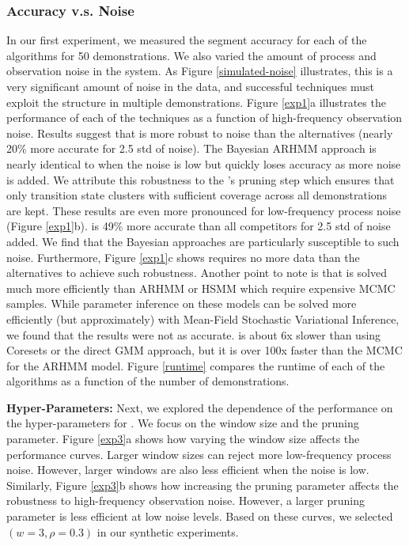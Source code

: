 \subsubsection{Accuracy v.s. Noise}
In our first experiment, we measured the segment accuracy for each of the algorithms for 50 demonstrations.
We also varied the amount of process and observation noise in the system.
As Figure \ref{simulated-noise} illustrates, this is a very significant amount of noise in the data, and successful techniques must exploit the structure in multiple demonstrations.
Figure \ref{exp1}a illustrates the performance of each of the techniques as a function of high-frequency observation noise.
Results suggest that \tsc is more robust to noise than the alternatives (nearly 20\% more accurate for 2.5 std of noise).
The Bayesian ARHMM approach is nearly identical to \tsc when the noise is low but quickly loses accuracy as more noise is added.
We attribute this robustness to the \tsc's pruning step which ensures that only transition state clusters with sufficient coverage across all demonstrations are kept.
These results are even more pronounced for low-frequency process noise (Figure \ref{exp1}b). \tsc is 49\% more accurate than all competitors for 2.5 std of noise added.
We find that the Bayesian approaches are particularly susceptible to such noise.
Furthermore, Figure \ref{exp1}c shows \tsc requires no more data than the alternatives to achieve such robustness.
Another point to note is that \tsc is solved much more efficiently than ARHMM or HSMM which require expensive MCMC samples.
While parameter inference on these models can be solved more efficiently (but approximately) with Mean-Field Stochastic Variational Inference, we found that the results were not as accurate.
\tsc is about 6x slower than using Coresets or the direct GMM approach, but it is over 100x faster than the MCMC for the ARHMM model.
Figure \ref{runtime} compares the runtime of each of the algorithms as a function of the number of demonstrations.

\textbf{\tsc Hyper-Parameters: }
Next, we explored the dependence of the performance on the hyper-parameters for \tsc.
We focus on the window size and the pruning parameter.
Figure \ref{exp3}a shows how varying the window size affects the performance curves.
Larger window sizes can reject more low-frequency process noise.
However, larger windows are also less efficient when the noise is low.
Similarly, Figure \ref{exp3}b shows how increasing the pruning parameter affects the robustness to high-frequency observation noise.
However, a larger pruning parameter is less efficient at low noise levels. 
Based on these curves, we selected $(w=3, \rho=0.3)$ in our synthetic experiments.

